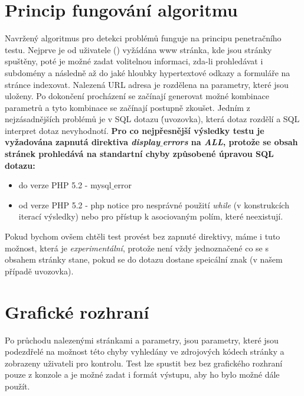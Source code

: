 \documentclass[12pt, a4paper]{report}
\begin{document}
\section{Princip fungování algoritmu}
Navržený algoritmus pro detekci problémů funguje na principu penetračního testu. Nejprve je od uživatele () vyžádána www stránka, kde jsou stránky spuštěny, poté je možné zadat volitelnou informaci, zda-li prohledávat i subdomény a následně až do jaké hloubky hypertextové odkazy a formuláře na stránce indexovat. Nalezená URL adresa je rozdělena na parametry, které jsou uloženy. Po dokončení procházení se začínají generovat možné kombinace parametrů a tyto kombinace se začínají postupně zkoušet. Jedním z nejzásadnějších problémů je v SQL dotazu \' (uvozovka), která dotaz rozdělí a SQL interpret dotaz nevyhodnotí.
 \textbf{Pro co nejpřesnější výsledky testu je vyžadována zapnutá direktiva \textit{display$\_$errors} na \textit{ALL}, protože se obsah stránek prohledává na standartní chyby způsobené úpravou SQL dotazu:}
\begin{itemize}
\item do verze PHP 5.2 - mysql$\_$error
\item od verze PHP 5.2 - php notice pro nesprávné použití \textit{while} (v konstrukcích iterací výsledky) nebo pro přístup k asociovaným polím, které neexistují.
\end{itemize}
Pokud bychom ovšem chtěli test provést bez zapnuté direktivy, máme i tuto možnost, která je \textit{experimentální}, protože není vždy jednoznačené co se s obsahem stránky stane, pokud se do dotazu dostane speicální znak (v našem případě uvozovka).

\section{Grafické rozhraní}
Po průchodu nalezenými stránkami a parametry, jsou parametry, které jsou podezdřelé na možnost této chyby vyhledány ve zdrojových kódech stránky a zobrazeny uživateli pro kontrolu.
Test lze spustit bez bez grafického rozhraní pouze z konzole a je možné zadat i formát výstupu, aby ho bylo možné dále použít.


\end{document}
